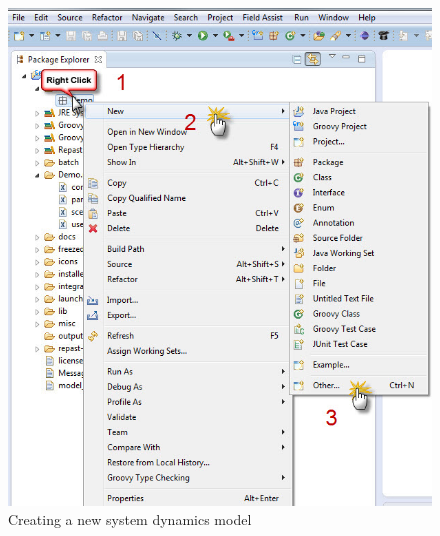 \documentclass[11pt]{amsart}
\begin{document}
\begin{figure}[ht]
\begin{center}
\vspace{.2in}
\centerline {
\includegraphics[totalheight=0.4\textheight]{images/006.jpg}
}
\caption{Creating a new system dynamics model}
\label{fig:006}
\end{center}
\end{figure}
\end{document}
